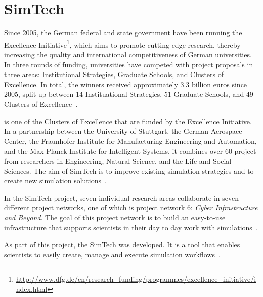 \section{SimTech}
\label{fundamentals:simtech}

Since 2005, the German federal and state government have been running the Excellence Initiative\footnote{\url{http://www.dfg.de/en/research_funding/programmes/excellence_initiative/index.html}}, which aims to promote cutting-edge research, thereby increasing the quality and international competitiveness of German universities.
In three rounds of funding, universities have competed with project proposals in three areas: Institutional Strategies, Graduate Schools, and Clusters of Excellence.
In total, the winners received approximately 3.3 billion euros since 2005, split up between 14 Instituational Strategies, 51 Graduate Schools, and 49 Clusters of Excellence~\autocite[pp.~16-18]{excellence:glance}.

 is one of the Clusters of Excellence that are funded by the Excellence Initiative.
In a partnership between the University of Stuttgart, the German Aerospace Center, the Fraunhofer Institute for Manufacturing Engineering and Automation, and the Max Planck Institute for Intelligent Systems, it combines over 60 project from researchers in Engineering, Natural Science, and the Life and Social Sciences.
The aim of SimTech is to improve existing simulation strategies and to create new simulation solutions~\autocite[pp.~109]{excellence:glance}.

In the SimTech project, seven individual research areas collaborate in seven different project networks, one of which is project network 6: \textit{Cyber Infrastructure and Beyond}.
The goal of this project network is to build an easy-to-use infrastructure that supports scientists in their day to day work with simulations~\autocite{simtech:projectnetwork6}.

As part of this project, the SimTech  was developed.
It is a tool that enables scientists to easily create, manage and execute simulation workflows~\autocite{workflow:simulation:flexibility}.
